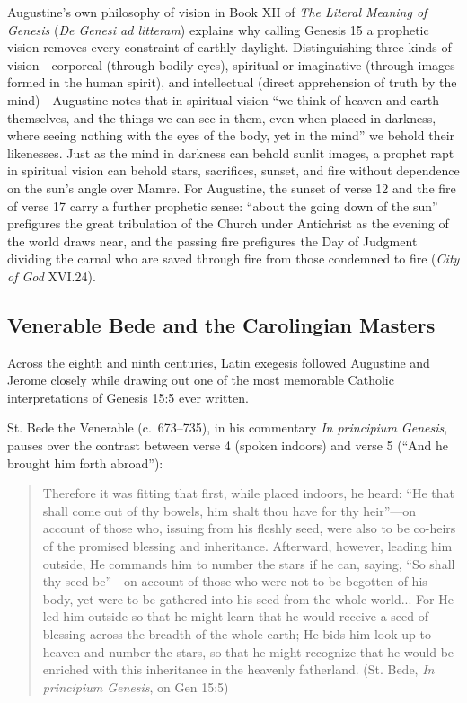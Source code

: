 Augustine's own philosophy of vision in Book XII of \emph{The Literal Meaning of Genesis} (\emph{De Genesi ad litteram}) explains why calling Genesis 15 a prophetic vision removes every constraint of earthly daylight. Distinguishing three kinds of vision---corporeal (through bodily eyes), spiritual or imaginative (through images formed in the human spirit), and intellectual (direct apprehension of truth by the mind)---Augustine notes that in spiritual vision ``we think of heaven and earth themselves, and the things we can see in them, even when placed in darkness, where seeing nothing with the eyes of the body, yet in the mind'' we behold their likenesses. Just as the mind in darkness can behold sunlit images, a prophet rapt in spiritual vision can behold stars, sacrifices, sunset, and fire without dependence on the sun's angle over Mamre. For Augustine, the sunset of verse 12 and the fire of verse 17 carry a further prophetic sense: ``about the going down of the sun'' prefigures the great tribulation of the Church under Antichrist as the evening of the world draws near, and the passing fire prefigures the Day of Judgment dividing the carnal who are saved through fire from those condemned to fire (\emph{City of God} XVI.24).

\subsection{Venerable Bede and the Carolingian Masters}

Across the eighth and ninth centuries, Latin exegesis followed Augustine and Jerome closely while drawing out one of the most memorable Catholic interpretations of Genesis 15:5 ever written.

St. Bede the Venerable (c.~673--735), in his commentary \emph{In principium Genesis}, pauses over the contrast between verse 4 (spoken indoors) and verse 5 (``And he brought him forth abroad''):

\begin{quote}
Therefore it was fitting that first, while placed indoors, he heard: ``He that shall come out of thy bowels, him shalt thou have for thy heir''---on account of those who, issuing from his fleshly seed, were also to be co-heirs of the promised blessing and inheritance. Afterward, however, leading him outside, He commands him to number the stars if he can, saying, ``So shall thy seed be''---on account of those who were not to be begotten of his body, yet were to be gathered into his seed from the whole world... For He led him outside so that he might learn that he would receive a seed of blessing across the breadth of the whole earth; He bids him look up to heaven and number the stars, so that he might recognize that he would be enriched with this inheritance in the heavenly fatherland. (St. Bede, \emph{In principium Genesis}, on Gen 15:5)
\end{quote}


